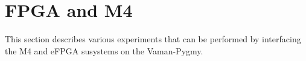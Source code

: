 \section{FPGA and M4}
This section describes various experiments that can be performed by interfacing
the M4 and eFPGA susystems on the Vaman-Pygmy.


